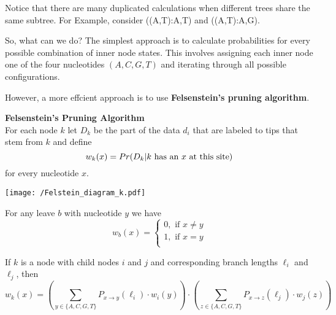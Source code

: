 \documentclass[12pt]{book}
\begin{document}
        Notice that there are many duplicated calculations when different trees share the same subtree. For Example, consider ((A,T):A,T) and ((A,T):A,G).

        So, what can we do? The simplest approach is to calculate probabilities for every possible combination of inner node states. This involves assigning each inner node one of the four nucleotides $(A, C, G, T)$ and iterating through all possible configurations.

        However, a more effcient approach is to use \textbf{Felsenstein's pruning algorithm}.
    
            \begin{defn}{\textbf{Felsenstein's Pruning Algorithm}}\\
                For each node $k$ let $D_k$ be the part of the data $d_i$ that are labeled to tips that stem from $k$ and define
                    \begin{equation*}
                        w_k(x) = Pr(D_k|\text{$ k $ has an $ x $ at this site})
                    \end{equation*}
                    for every nucleotide $x$.

                    \begin{center}
                        \texttt{[image: /Felstein\_diagram\_k.pdf]}
                    \end{center}
                        
                    For any leave $b$ with nucleotide $y$ we have
                        \begin{equation*}
                            w_b(x) = 
                            \begin{cases}
                                0, \text{ if } x \neq y\\
                                1, \text{ if } x = y\\
                            \end{cases}
                        \end{equation*}
            
                    If $k$ is a node with child nodes $i$ and $j$ and corresponding branch lengths $\ell_i$ and $\ell_j$, then
                        \begin{equation}\label{eq:\thesection:F-P_algorithm1}
                            w_k(x) = 
                            \left( \sum_{y \in \{ A, C, G, T\}} P_{x \rightarrow y}(\ell_i) \cdot w_i(y) \right) \cdot
                            \left( \sum_{z \in \{ A, C, G, T\}} P_{x \rightarrow z}(\ell_j) \cdot w_j(z) \right)
                        \end{equation}
                    

\end{defn}
\end{document}
